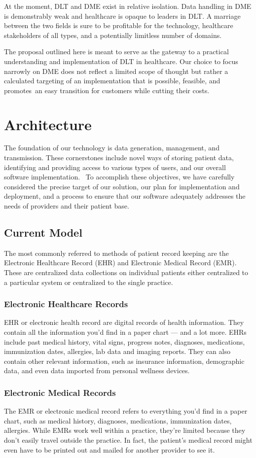\documentclass[letterpaper]{article}
\begin{document}
  At the moment, DLT and DME exist in relative isolation. Data handling in DME is demonstrably weak and healthcare is opaque to leaders in DLT. A marriage between the two fields is sure to be profitable for the technology, healthcare stakeholders of all types, and a potentially limitless number of domains.

  The proposal outlined here is meant to serve as the gateway to a practical understanding and implementation of DLT in healthcare. Our choice to focus narrowly on DME does not reflect a limited scope of thought but rather a calculated targeting of an implementation that is possible, feasible, and promotes an easy transition for customers while cutting their costs.
%
\section{Architecture}
The foundation of our technology is data generation, management, and transmission. These cornerstones include novel ways of storing patient data, identifying and providing access to various types of users, and our overall software implementation. 
%
To accomplish these objectives, we have carefully considered the precise target of our solution, our plan for implementation and deployment, and a process to ensure that our software adequately addresses the needs of providers and their patient base.
%
\subsection{Current Model}
The most commonly referred to methods of patient record keeping are the Electronic Healthcare Record (EHR) and Electronic Medical Record (EMR). These are centralized data collections on individual patients either centralized to a particular system or centralized to the single practice.
%
  \subsubsection{Electronic Healthcare Records}
  EHR or electronic health record are digital records of health information. They contain all the information you’d find in a paper chart — and a lot more. EHRs include past medical history, vital signs, progress notes, diagnoses, medications, immunization dates, allergies, lab data and imaging reports. They can also contain other relevant information, such as insurance information, demographic data, and even data imported from personal wellness devices.
%
  \subsubsection{Electronic Medical Records}
  The EMR or electronic medical record refers to everything you’d find in a paper chart, such as medical history, diagnoses, medications, immunization dates, allergies. While EMRs work well within a practice, they’re limited because they don’t easily travel outside the practice. In fact, the patient’s medical record might even have to be printed out and mailed for another provider to see it.
%
\end{document}
